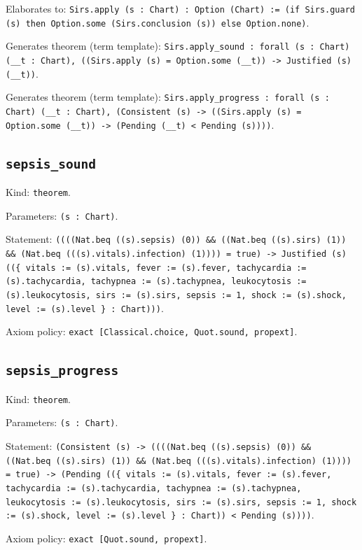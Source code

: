 \documentclass[11pt]{article}
\begin{document}
\noindent Elaborates to: \texttt{Sirs.apply (s : Chart) : Option (Chart) := (if Sirs.guard (s) then Option.some (Sirs.conclusion (s)) else Option.none)}.\par
\noindent Generates theorem (term template): \texttt{Sirs.apply\_sound : forall (s : Chart) (\_\_t : Chart), ((Sirs.apply (s) = Option.some (\_\_t)) -> Justified (s) (\_\_t))}.\par
\noindent Generates theorem (term template): \texttt{Sirs.apply\_progress : forall (s : Chart) (\_\_t : Chart), (Consistent (s) -> ((Sirs.apply (s) = Option.some (\_\_t)) -> (Pending (\_\_t) < Pending (s))))}.\par
\subsection*{\texttt{sepsis\_sound}}
\noindent Kind: \texttt{theorem}.\par
\noindent Parameters: \texttt{(s : Chart)}.\par
\noindent Statement: \texttt{((((Nat.beq ((s).sepsis) (0)) \&\& ((Nat.beq ((s).sirs) (1)) \&\& (Nat.beq (((s).vitals).infection) (1)))) = true) -> Justified (s) ((\{ vitals := (s).vitals, fever := (s).fever, tachycardia := (s).tachycardia, tachypnea := (s).tachypnea, leukocytosis := (s).leukocytosis, sirs := (s).sirs, sepsis := 1, shock := (s).shock, level := (s).level \} : Chart)))}.\par
\noindent Axiom policy: \texttt{exact [Classical.choice, Quot.sound, propext]}.\par
\subsection*{\texttt{sepsis\_progress}}
\noindent Kind: \texttt{theorem}.\par
\noindent Parameters: \texttt{(s : Chart)}.\par
\noindent Statement: \texttt{(Consistent (s) -> ((((Nat.beq ((s).sepsis) (0)) \&\& ((Nat.beq ((s).sirs) (1)) \&\& (Nat.beq (((s).vitals).infection) (1)))) = true) -> (Pending ((\{ vitals := (s).vitals, fever := (s).fever, tachycardia := (s).tachycardia, tachypnea := (s).tachypnea, leukocytosis := (s).leukocytosis, sirs := (s).sirs, sepsis := 1, shock := (s).shock, level := (s).level \} : Chart)) < Pending (s))))}.\par
\noindent Axiom policy: \texttt{exact [Quot.sound, propext]}.\par
\end{document}

